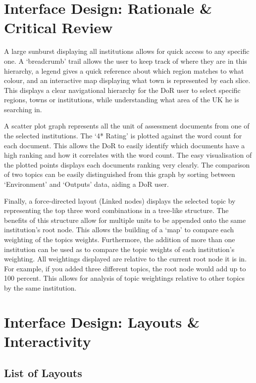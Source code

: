 \documentclass[a4paper, 11pt]{article}
\begin{document}
\newpage
\section{Interface Design: Rationale \& Critical Review}

A large sunburst displaying all institutions allows for quick access to any specific one. A `breadcrumb' trail allows the user to keep track of where they are in this hierarchy, a legend gives a quick reference about which region matches to what colour, and an interactive map displaying what town is represented by each slice. This displays a clear navigational hierarchy for the DoR user to select specific regions, towns or institutions, while understanding what area of the UK he is searching in. 

A scatter plot graph represents all the unit of assessment documents from one of the selected institutions. The `4* Rating' is plotted against the word count for each document. This allows the DoR to easily identify which documents have a high ranking and how it correlates with the word count. The easy visualisation of the plotted points displays each documents ranking very clearly. The comparison of two topics can be easily distinguished from this graph by sorting between `Environment' and `Outputs' data, aiding a DoR user.

Finally, a force-directed layout (Linked nodes) displays the selected topic by representing the top three word combinations in a tree-like structure. The benefits of this structure allow for multiple units to be appended onto the same institution's root node. This allows the building of a `map' to compare each weighting of the topics weights. Furthermore, the addition of more than one institution can be used as to compare the topic weights of each institution's weighting. All weightings displayed are relative to the current root node it is in. For example, if you added three different topics, the root node would add up to 100 percent. This allows for analysis of topic weightings relative to other topics by the same institution.


\section{Interface Design: Layouts \& Interactivity}
\subsection{List of Layouts}
\end{document}

